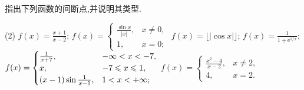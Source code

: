 \begin{exercise}[2.1.6]
    指出下列函数的间断点,并说明其类型.
    \begin{tasks}[label=(\arabic*)](2)
        \task $f(x) = \frac{x+1}{x-2}$;
        \task $f(x) = \begin{cases} \frac{\sin x}{|x|}, & x \ne 0, \\ 1, & x=0; \end{cases}$
        \task $f(x) = \lfloor|\cos x|\rfloor$;
        \task $f(x) = \frac{1}{1+\mathrm{e}^{1/x}}$;
        \task $f(x) = \begin{cases} \frac{1}{x+7}, & -\infty < x < -7, \\ x, & -7 \leqslant x \leqslant 1, \\ (x-1)\sin\frac{1}{x-1}, & 1 < x < +\infty; \end{cases}$
        \task[]
        \task[(6)] $f(x) = \begin{cases} \frac{x^2-4}{x-2}, & x \ne 2, \\ 4, & x=2. \end{cases}$
    \end{tasks}
\end{exercise}

